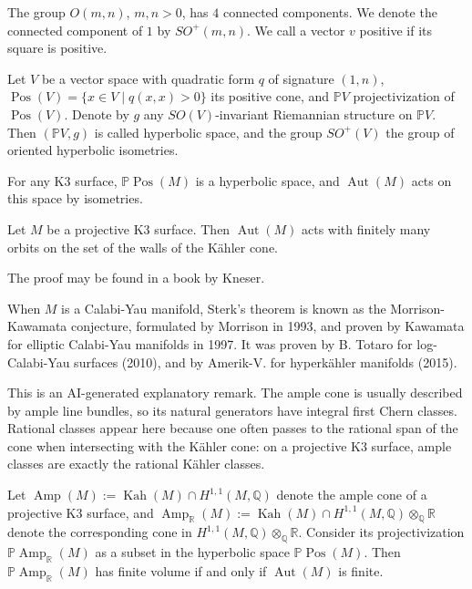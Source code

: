 \begin{remark}
The group $O(m,n)$, $m,n > 0$, has $4$ connected
components. We denote the connected component of $1$
by $SO^+(m,n)$. We call a vector $v$ positive if its
square is positive.
\end{remark}

\begin{definition}
Let $V$ be a vector space with quadratic form $q$
of signature $(1,n)$, $\operatorname{Pos}(V)=\{x\in
V \mid q(x,x)>0\}$ its positive cone, and
$\mathbb{P}V$ projectivization of $\operatorname{Pos}(V)$.
Denote by $g$ any $SO(V)$-invariant Riemannian
structure on $\mathbb{P}V$. Then $(\mathbb{P}V,g)$ is
called hyperbolic space, and the group $SO^+(V)$ the
group of oriented hyperbolic isometries.
\end{definition}

\begin{example}
For any K3 surface, $\mathbb{P}\operatorname{Pos}(M)$
is a hyperbolic space, and $\operatorname{Aut}(M)$
acts on this space by isometries.
\end{example}

\begin{theorem}[Sterk, 1985]
Let $M$ be a projective K3 surface. Then
$\operatorname{Aut}(M)$ acts with finitely many orbits
on the set of the walls of the Kähler cone.
\end{theorem}

\noindent
The proof may be found in a book by Kneser.

\medskip\noindent
When $M$ is a Calabi-Yau manifold, Sterk's
theorem is known as the Morrison-Kawamata
conjecture, formulated by Morrison in 1993,
and proven by Kawamata for elliptic Calabi-Yau
manifolds in 1997. It was proven by B. Totaro
for log-Calabi-Yau surfaces (2010), and by
Amerik-V. for hyperkähler manifolds (2015).

\begin{remark}
This is an AI-generated explanatory remark.
The ample cone is usually described by ample line
bundles, so its natural generators have integral
first Chern classes. Rational classes appear here
because one often passes to the rational span of
the cone when intersecting with the Kähler cone:
on a projective K3 surface, ample classes are
exactly the rational Kähler classes.
\end{remark}

\begin{lemma}
Let $\operatorname{Amp}(M):=\operatorname{Kah}(M)\cap H^{1,1}(M,\mathbb{Q})$
denote the ample cone of a projective K3
surface, and $\operatorname{Amp}_{\mathbb{R}}(M):=
\operatorname{Kah}(M)\cap H^{1,1}(M,\mathbb{Q})\otimes_{\mathbb{Q}}\mathbb{R}$
denote the corresponding cone in
$H^{1,1}(M,\mathbb{Q})\otimes_{\mathbb{Q}}\mathbb{R}$.
Consider its projectivization
$\mathbb{P}\operatorname{Amp}_{\mathbb{R}}(M)$ as a
subset in the hyperbolic space $\mathbb{P}\operatorname{Pos}(M)$.
Then $\mathbb{P}\operatorname{Amp}_{\mathbb{R}}(M)$
has finite volume if and only if
$\operatorname{Aut}(M)$ is finite.
\end{lemma}

